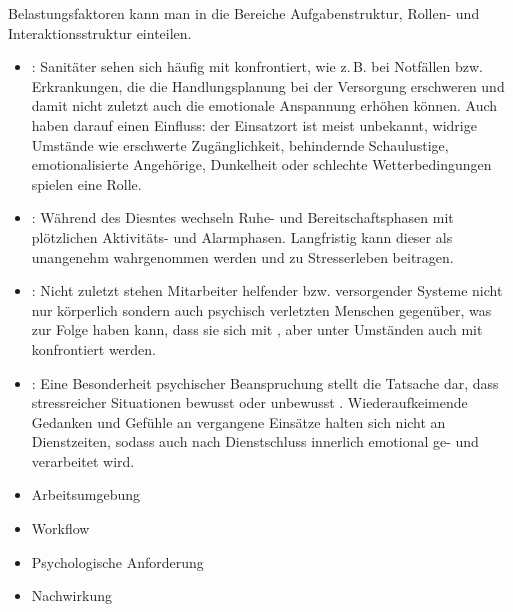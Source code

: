  

Belastungsfaktoren kann man in die
Bereiche Aufgabenstruktur, Rollen- und Interaktionsstruktur
einteilen.


{\begin{itemize}
  \item {}: Sanitäter sehen sich häufig
  mit  konfrontiert, wie
  z.\,B. bei Notfällen bzw. Erkrankungen, die die
  Handlungsplanung bei der Versorgung erschweren und damit
  nicht zuletzt auch die emotionale Anspannung erhöhen können.
  Auch  haben darauf einen
  Einfluss: der Einsatzort ist meist unbekannt, widrige
  Umstände wie erschwerte Zugänglichkeit, behindernde
  Schaulustige, emotionalisierte Angehörige, Dunkelheit oder
  schlechte Wetterbedingungen spielen eine Rolle.
  
  \item {}: Während des Diesntes wechseln
   Ruhe- und Bereitschaftsphasen mit plötzlichen Aktivitäts-
   und Alarmphasen. Langfristig kann dieser  als unangenehm wahrgenommen
  werden und zu Stresserleben beitragen.
  
  \item {}: Nicht zuletzt
  stehen Mitarbeiter helfender bzw. versorgender Systeme nicht
  nur körperlich sondern auch psychisch verletzten Menschen
  gegenüber, was zur Folge haben kann, dass sie sich mit
  , aber unter Umständen auch mit
   konfrontiert werden.
  
  \item {}: Eine Besonderheit psychischer
  Beanspruchung stellt die Tatsache dar, dass  stressreicher Situationen
  bewusst oder unbewusst . Wiederaufkeimende
  Gedanken und Gefühle an vergangene Einsätze halten sich
  nicht an Dienstzeiten, sodass auch nach Dienstschluss
  innerlich emotional ge- und verarbeitet wird.
\end{itemize}}
{\begin{itemize}
  \item {Arbeitsumgebung}
  \item {Workflow}
  \item {Psychologische Anforderung} 
  \item {Nachwirkung}
\end{itemize}}
{}
{}
{}

